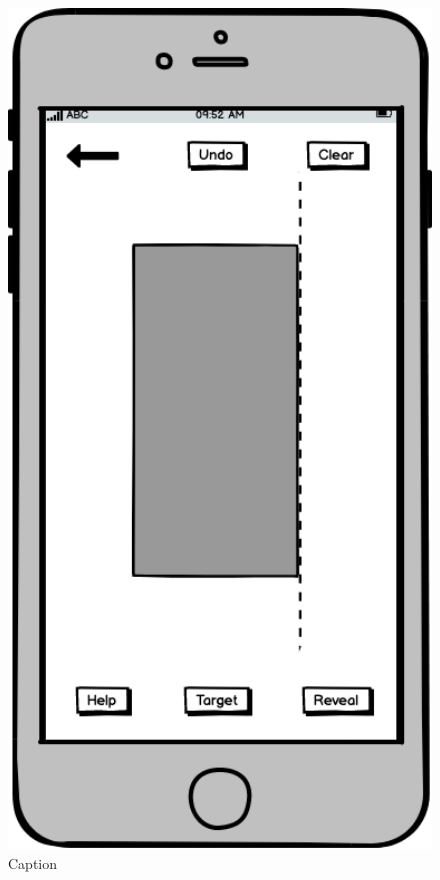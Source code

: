 \documentclass[11pt]{article}
\begin{document}
           \begin{figure}
                \begin{minipage}[c]{0.65\textwidth}
                \caption{Caption}
                \label{fig:matchPatternCreate}
                \end{minipage}\hfill
                \begin{minipage}[c]{0.35\textwidth}
                \includegraphics[width=1\textwidth]{Images/Prototype/prototypeMatchPatternCreate.png}
                \end{minipage}
            \end{figure}
                        \clearpage
\end{document}
